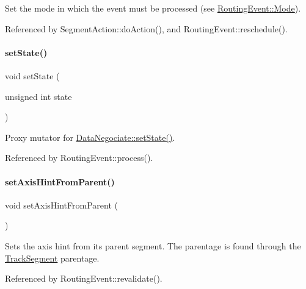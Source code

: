 Set the mode in which the event must be processed (see \mbox{\hyperlink{classKite_1_1RoutingEvent_a46c8a310cf4c094f8c80e1cb8dc1f911}{Routing\+Event\+::\+Mode}}). 

Referenced by Segment\+Action\+::do\+Action(), and Routing\+Event\+::reschedule().

\mbox{\label{classKite_1_1RoutingEvent_af7ce7f73feb28f3df8f3180632a2f731}} 
\paragraph{\texorpdfstring{set\+State()}{setState()}}
{\footnotesize\ttfamily void set\+State (\begin{DoxyParamCaption}\item[{unsigned int}]{state }\end{DoxyParamCaption})}

Proxy mutator for \mbox{\hyperlink{classKite_1_1DataNegociate_aafc8cd0dcd351625a12904bed7d5a7d1}{Data\+Negociate\+::set\+State()}}. 

Referenced by Routing\+Event\+::process().

\mbox{\label{classKite_1_1RoutingEvent_a02a3f1f2801d4ebbbe676e062878faae}} 
\paragraph{\texorpdfstring{set\+Axis\+Hint\+From\+Parent()}{setAxisHintFromParent()}}
{\footnotesize\ttfamily void set\+Axis\+Hint\+From\+Parent (\begin{DoxyParamCaption}{ }\end{DoxyParamCaption})}

Sets the axis hint from it\textquotesingle{}s parent segment. The parentage is found through the \mbox{\hyperlink{classKite_1_1TrackSegment}{Track\+Segment}} parentage. 

Referenced by Routing\+Event\+::revalidate().

\mbox{\label{classKite_1_1RoutingEvent_a86c4b1b3d406c12667188ad44ce366db}} 
